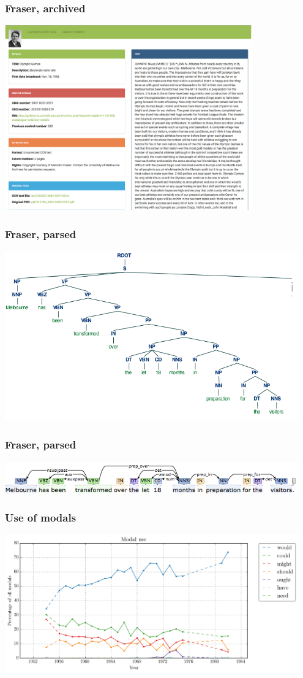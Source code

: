 \documentclass{beamer}       %
\begin{document}
\begin{frame}
    \frametitle{Fraser, archived}
    \centering
    \includegraphics[width=0.80\textwidth]{images/digfab}
\end{frame}


\begin{frame}
    \frametitle{Fraser, parsed}
    \centering
    \includegraphics[width=0.95\textwidth]{images/melbtree}
\end{frame}

\begin{frame}
    \frametitle{Fraser, parsed}
    \centering
    \includegraphics[width=0.95\textwidth]{images/melbdep}
\end{frame}

\begin{frame}
\frametitle{Use of modals}
    \centering
    \includegraphics[width=0.95\textwidth]{images/modal-use.png}
\end{frame}
\end{document}
